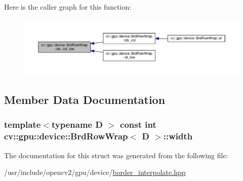 Here is the caller graph for this function\-:\nopagebreak
\begin{figure}[H]
\begin{center}
\leavevmode
\includegraphics[width=350pt]{structcv_1_1gpu_1_1device_1_1BrdRowWrap_a718ab3edbcdaf24d76255fbb5388cfd8_icgraph}
\end{center}
\end{figure}




\subsection{Member Data Documentation}
\hypertarget{structcv_1_1gpu_1_1device_1_1BrdRowWrap_a1a55bf1ce3b855b77939b514f805b02e}{
\subsubsection[{width}]{\setlength{\rightskip}{0pt plus 5cm}template$<$typename D $>$ const int {\bf cv\-::gpu\-::device\-::\-Brd\-Row\-Wrap}$<$ D $>$\-::width}}\label{structcv_1_1gpu_1_1device_1_1BrdRowWrap_a1a55bf1ce3b855b77939b514f805b02e}


The documentation for this struct was generated from the following file\-:\begin{DoxyCompactItemize}
\item 
/usr/include/opencv2/gpu/device/\hyperlink{border__interpolate_8hpp}{border\-\_\-interpolate.\-hpp}\end{DoxyCompactItemize}
